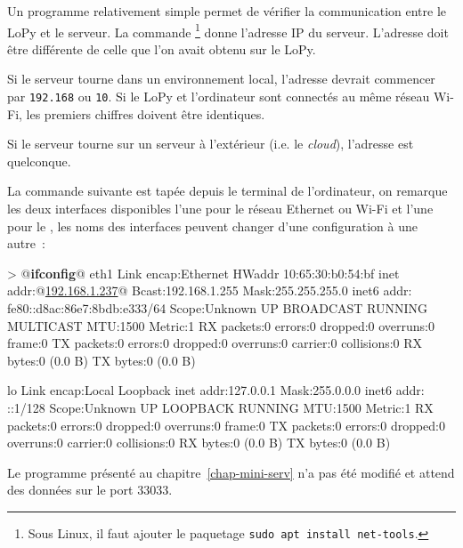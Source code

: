 Un programme relativement simple permet de vérifier la communication entre le LoPy et le serveur. La commande \footnote{Sous Linux, il faut ajouter le paquetage  \texttt{sudo apt install net-tools}.} donne l'adresse IP du serveur. L'adresse doit être différente de celle que l'on avait obtenu sur le LoPy. 

Si le serveur tourne dans un environnement local, l'adresse devrait commencer par \texttt{192.168} ou \texttt{10}. Si le LoPy et l'ordinateur sont connectés au même réseau Wi-Fi, les premiers chiffres doivent être identiques. 

Si le serveur tourne sur un serveur à l'extérieur (i.e. le \textit{cloud}), l'adresse est quelconque.

     \vspace{1em}

La commande suivante est tapée depuis le terminal de l'ordinateur, on remarque les deux interfaces disponibles l'une pour le réseau Ethernet ou Wi-Fi et l'une pour le \textit{}, les noms des interfaces peuvent changer d'une configuration à une autre~:

\begin{termc}[backgroundcolor=\color{palerod},  basicstyle=\ttfamily\small, escapechar=@]
> @\textbf{ifconfig}@
eth1      Link encap:Ethernet  HWaddr 10:65:30:b0:54:bf
          inet addr:@\ul{192.168.1.237}@  Bcast:192.168.1.255  Mask:255.255.255.0
          inet6 addr: fe80::d8ac:86e7:8bdb:e333/64 Scope:Unknown
          UP BROADCAST RUNNING MULTICAST  MTU:1500  Metric:1
          RX packets:0 errors:0 dropped:0 overruns:0 frame:0
          TX packets:0 errors:0 dropped:0 overruns:0 carrier:0
          collisions:0
          RX bytes:0 (0.0 B)  TX bytes:0 (0.0 B)

lo        Link encap:Local Loopback
          inet addr:127.0.0.1  Mask:255.0.0.0
          inet6 addr: ::1/128 Scope:Unknown
          UP LOOPBACK RUNNING  MTU:1500  Metric:1
          RX packets:0 errors:0 dropped:0 overruns:0 frame:0
          TX packets:0 errors:0 dropped:0 overruns:0 carrier:0
          collisions:0
          RX bytes:0 (0.0 B)  TX bytes:0 (0.0 B)
\end{termc}

Le programme  présenté au chapitre~\vref{chap-mini-serv} n'a pas été modifié et attend des données sur le port 33033.

     \vspace{1em}

